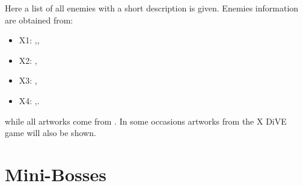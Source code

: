 Here a list of all enemies with a short description is given. Enemies information are obtained from: 
\begin{itemize}
	\item X1: \cite{wayback:X_resources},\cite{wiki:X1_enemies},
	\item X2: \cite{wayback:X2_resources},\cite{wiki:X2_enemies}
	\item X3: \cite{wayback:X3_resources},\cite{wiki:X3_enemies}
	\item X4: \cite{wayback:X4_resources},\cite{wiki:X4_enemies}.
\end{itemize}
while all artworks come from \cite{book:MMX_Complete_art}. In some occasions artworks from the X DiVE game will also  be shown.

\section{Mini-Bosses}
